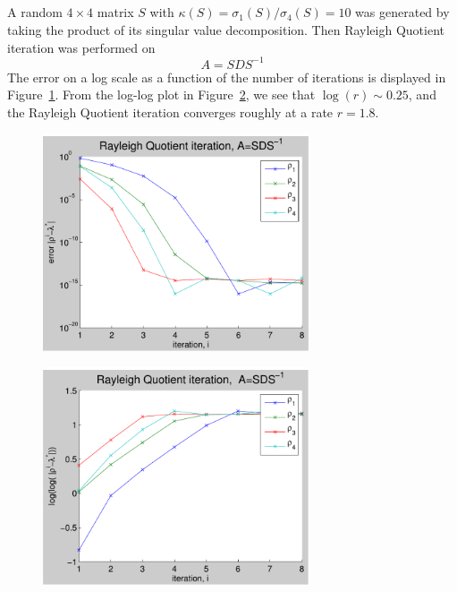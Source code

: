 \documentclass[11pt]{article} %
\begin{document}
\subsection{} %
A random $4 \times 4$ matrix $S$ with $\kappa(S) =\sigma_1(S)/\sigma_4(S)=10$ was generated by taking the product of its singular value decomposition. Then Rayleigh Quotient iteration was performed on
\begin{equation}
A=SDS^{-1}
\end{equation}
The error on a log scale as a function of the number of iterations is displayed in Figure~\ref{fig:p3c}. From the log-log plot in Figure~\ref{fig:p3clog}, we see that $\log(r) \sim 0.25$, and the Rayleigh Quotient iteration converges roughly at a rate $r = 1.8$.
\begin{figure}[h!]
  \centering
    \includegraphics[width=0.7\textwidth]{p3c}
  \caption{}
\label{fig:p3c}
\end{figure}

\begin{figure}[h!]
  \centering
    \includegraphics[width=0.7\textwidth]{p3clog}
  \caption{}
\label{fig:p3clog}
\end{figure}
\end{document}
